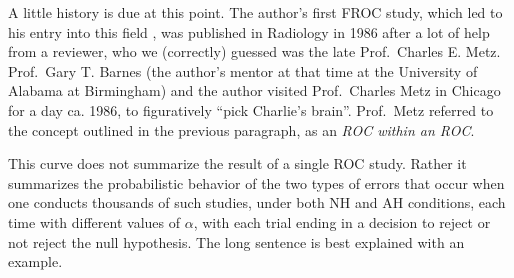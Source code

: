 \documentclass[
]{book}
\begin{document}
A little history is due at this point. The author's first FROC study, which led to his entry into this field \citep{RN621}, was published in Radiology in 1986 after a lot of help from a reviewer, who we (correctly) guessed was the late Prof.~Charles E. Metz. Prof.~Gary T. Barnes (the author's mentor at that time at the University of Alabama at Birmingham) and the author visited Prof.~Charles Metz in Chicago for a day ca. 1986, to figuratively ``pick Charlie's brain''. Prof.~Metz referred to the concept outlined in the previous paragraph, as an \emph{ROC within an ROC}.

This curve does not summarize the result of a single ROC study. Rather it summarizes the probabilistic behavior of the two types of errors that occur when one conducts thousands of such studies, under both NH and AH conditions, each time with different values of \(\alpha\), with each trial ending in a decision to reject or not reject the null hypothesis. The long sentence is best explained with an example.
\end{document}
